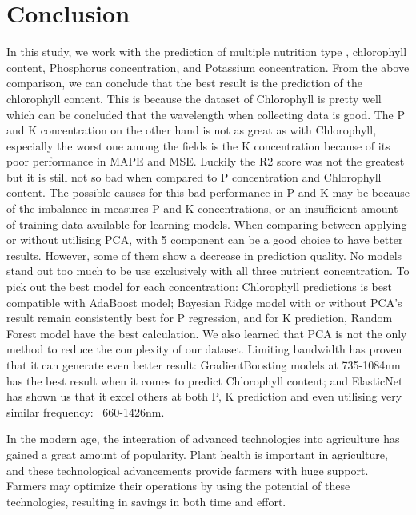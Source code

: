 \section{Conclusion}

In this study, we work with the prediction of multiple nutrition type , chlorophyll content, Phosphorus concentration, and Potassium concentration. From the above comparison, we can conclude that the best result is the prediction of the chlorophyll content. This is because the dataset of Chlorophyll is pretty well which can be concluded that the wavelength when collecting data is good. The P and K concentration on the other hand is not as great as with Chlorophyll, especially the worst one among the fields is the K concentration because of its poor performance in MAPE and MSE. Luckily the  R2  score was not the greatest but it is still not so bad when compared to P concentration and Chlorophyll content. The possible causes for this bad performance in P and K may be because of the imbalance in measures P and K concentrations, or an insufficient amount of training data available for learning models. When comparing between applying or without utilising PCA, with 5 component can be a good choice to have better results. However, some of them show a decrease in prediction quality.
No models stand out too much to be use exclusively with all three nutrient concentration. To pick out the best model for each concentration: Chlorophyll predictions is best compatible with AdaBoost model; Bayesian Ridge model with or without PCA's result remain consistently best for P regression, and for K prediction, Random Forest model have the best calculation.
We also learned that PCA is not the only method to reduce the complexity of our dataset. Limiting bandwidth has proven that it can generate even better result: GradientBoosting models at 735-1084nm has the best result when it comes to predict Chlorophyll content; and ElasticNet has shown us that it excel others at both P, K prediction and even utilising very similar frequency: ~660-1426nm.
 
In the modern age, the integration of advanced technologies into agriculture has gained a great amount of popularity. Plant health is important in agriculture, and these technological advancements provide farmers with huge support. Farmers may optimize their operations by using the potential of these technologies, resulting in savings in both time and effort.
